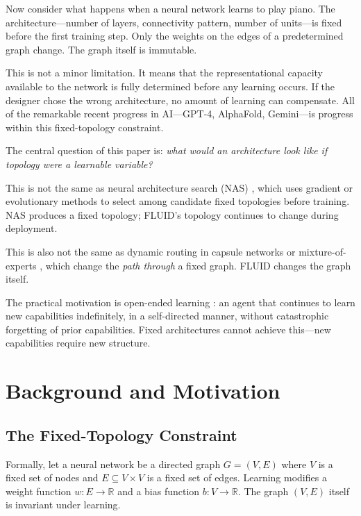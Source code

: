 \documentclass[12pt]{article}
\begin{document}
Now consider what happens when a neural network learns to play piano. The architecture---number of layers, connectivity pattern, number of units---is fixed before the first training step. Only the weights on the edges of a predetermined graph change. The graph itself is immutable.

This is not a minor limitation. It means that the representational capacity available to the network is fully determined before any learning occurs. If the designer chose the wrong architecture, no amount of learning can compensate. All of the remarkable recent progress in AI---GPT-4, AlphaFold, Gemini---is progress within this fixed-topology constraint.

The central question of this paper is: \textit{what would an architecture look like if topology were a learnable variable?}

This is not the same as neural architecture search (NAS) \cite{zoph2017}, which uses gradient or evolutionary methods to select among candidate fixed topologies before training. NAS produces a fixed topology; FLUID's topology continues to change during deployment.

This is also not the same as dynamic routing in capsule networks \cite{sabour2017} or mixture-of-experts \cite{shazeer2017}, which change the \textit{path through} a fixed graph. FLUID changes the graph itself.

The practical motivation is open-ended learning \cite{stanley2019}: an agent that continues to learn new capabilities indefinitely, in a self-directed manner, without catastrophic forgetting of prior capabilities. Fixed architectures cannot achieve this---new capabilities require new structure.

\section{Background and Motivation}

\subsection{The Fixed-Topology Constraint}

Formally, let a neural network be a directed graph $G = (V, E)$ where $V$ is a fixed set of nodes and $E \subseteq V \times V$ is a fixed set of edges. Learning modifies a weight function $w: E \rightarrow \mathbb{R}$ and a bias function $b: V \rightarrow \mathbb{R}$. The graph $(V, E)$ itself is invariant under learning.
\end{document}
